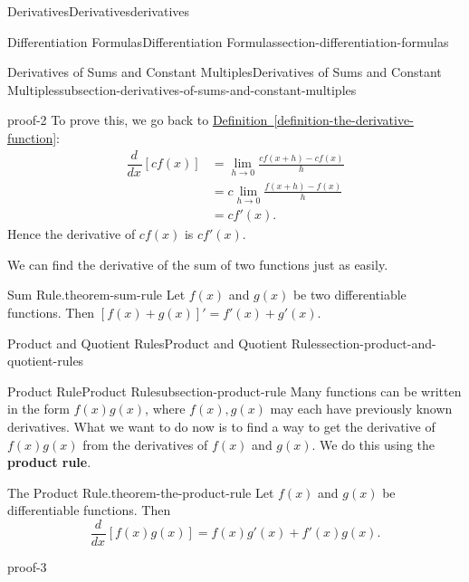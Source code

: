 \documentclass[oneside,10pt,]{book}
\newcommand{\terminology}[1]{\textbf{#1}}
\numberwithin{equation}{section}
\newcommand{\dv}[3][]{\dfrac{d^{#1} #2}{d #3^{#1}}}
\begin{document}
\begin{chapterptx}{Derivatives}{}{Derivatives}{}{}{derivatives}
\begin{sectionptx}{Differentiation Formulas}{}{Differentiation Formulas}{}{}{section-differentiation-formulas}
\begin{subsectionptx}{Derivatives of Sums and Constant Multiples}{}{Derivatives of Sums and Constant Multiples}{}{}{subsection-derivatives-of-sums-and-constant-multiples}
\begin{proofptx}{}{proof-2}
\hypertarget{p-136}{}%
To prove this, we go back to \hyperref[definition-the-derivative-function]{Definition~\ref{definition-the-derivative-function}}:%
\begin{align*}
\dv{}{x}[cf(x)] & = \lim_{h\to0}\frac{cf(x+h) - cf(x)}{h} \\
& = c\lim_{h\to0}\frac{f(x+h) - f(x)}{h} \\
& = cf'(x). 
\end{align*}
Hence the derivative of \(cf(x)\) is \(cf'(x)\).%
\end{proofptx}
\hypertarget{p-137}{}%
We can find the derivative of the sum of two functions just as easily.%
\begin{theorem}{Sum Rule.}{}{theorem-sum-rule}%
\hypertarget{p-138}{}%
Let \(f(x)\) and \(g(x)\) be two differentiable functions. Then \([f(x)+g(x)]' = f'(x) + g'(x)\).%
\end{theorem}
\end{subsectionptx}
\end{sectionptx}
%
%
\typeout{************************************************}
\typeout{************************************************}
%
\begin{sectionptx}{Product and Quotient Rules}{}{Product and Quotient Rules}{}{}{section-product-and-quotient-rules}
%
%
\typeout{************************************************}
\typeout{************************************************}
%
\begin{subsectionptx}{Product Rule}{}{Product Rule}{}{}{subsection-product-rule}
\hypertarget{p-139}{}%
Many functions can be written in the form \(f(x)g(x)\), where \(f(x),g(x)\) may each have previously known derivatives. What we want to do now is to find a way to get the derivative of \(f(x)g(x)\) from the derivatives of \(f(x)\) and \(g(x)\). We do this using the \terminology{product rule}.%
\begin{theorem}{The Product Rule.}{}{theorem-the-product-rule}%
\hypertarget{p-140}{}%
Let \(f(x)\) and \(g(x)\) be differentiable functions. Then%
\begin{equation*}
\dv{}{x}[f(x)g(x)] = f(x)g'(x) + f'(x)g(x).
\end{equation*}
%
\end{theorem}
\begin{proofptx}{}{proof-3}

\end{proofptx}
\end{subsectionptx}
\end{sectionptx}
\end{chapterptx}
\end{document}
